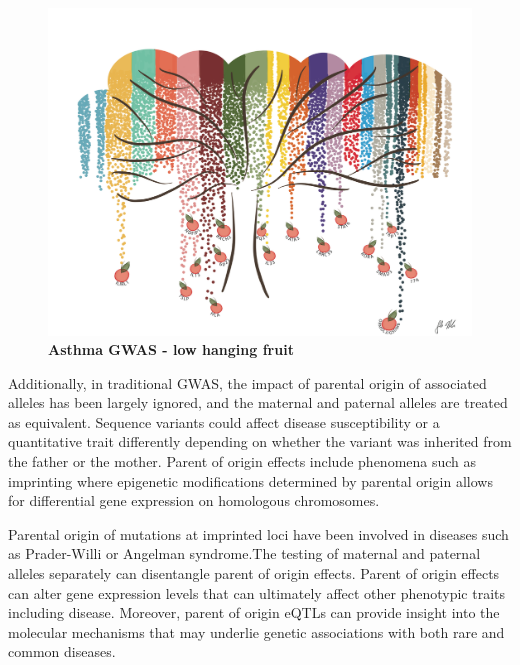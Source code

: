 \begin{figure}
\centering
\includegraphics[width=5in]{img/ch01/fig-01-lowhangingfruit.pdf}
\caption[Low Hanging Fruit.]{\textbf{Asthma GWAS - low hanging fruit}}
\label{fig:lowhangingfruit}
\end{figure}

Additionally, in traditional GWAS, the impact of parental origin of associated alleles has been largely ignored, and the maternal and paternal alleles are treated as equivalent. Sequence variants could affect disease susceptibility or a quantitative trait differently depending on whether the variant was inherited from the father or the mother. Parent of origin effects include phenomena such as imprinting where epigenetic modifications determined by parental origin allows for differential gene expression on homologous chromosomes\cite{Lokody2014,Lawson2013}. 

Parental origin of mutations at imprinted loci have been involved in diseases such as Prader-Willi or Angelman syndrome\cite{Lawson2013,Peters2014}.The testing of maternal and paternal alleles separately can disentangle parent of origin effects. Parent of origin effects can alter gene expression levels that can ultimately affect other phenotypic traits including disease. Moreover, parent of origin eQTLs can provide insight into the molecular mechanisms that may underlie genetic associations with both rare and common diseases\cite{Lawson2013,Peters2014,Kong:2009kk,Stridh2014,Falls1999}.

